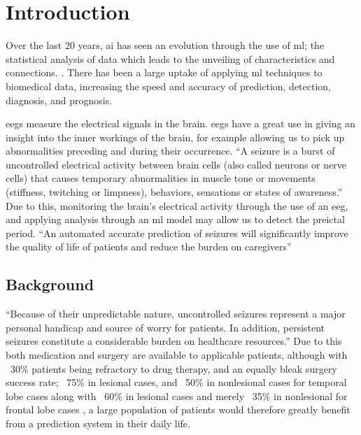 \documentclass[12pt]{article}
\begin{document}
\section{Introduction}


Over the last 20 years, \acrfull{ai} has seen an evolution through the use of \acrfull{ml}; the statistical analysis of data which leads to the unveiling of characteristics and connections. \cite{awad2015efficient}. There has been a large uptake of applying \acrshort{ml} techniques to biomedical data, increasing the speed and accuracy of prediction, detection, diagnosis, and prognosis. 

\acrfull{eegs} measure the electrical signals in the brain. \acrshort{eegs} have a great use in giving an insight into the inner workings of the brain, for example allowing us to pick up abnormalities preceding and during their occurrence. ``A seizure is a burst of uncontrolled electrical activity between brain cells (also called neurons or nerve cells) that causes temporary abnormalities in muscle tone or movements (stiffness, twitching or limpness), behaviors, sensations or states of awareness.'' \cite{johnHopkinsTypesOfSeizures} Due to this, monitoring the brain's electrical activity through the use of an \acrshort{eeg}, and applying analysis through an \acrshort{ml} model may allow us to detect the preictal period. ``An automated accurate prediction of seizures will significantly improve the quality of life of patients and reduce the burden on caregivers'' \cite{acharya2018automated}


\subsection{Background}

``Because of their unpredictable nature, uncontrolled seizures represent a major personal handicap and source of worry for patients. In addition, persistent seizures constitute a considerable burden on healthcare resources.'' \cite{assi2017towards} Due to this both medication and surgery are available to applicable patients, although with ~30\% patients being refractory to drug therapy, and an equally bleak surgery success rate; ~75\% in lesional cases, and ~50\% in nonlesional cases for temporal lobe cases along with ~60\% in lesional cases and merely ~35\% in nonlesional for frontal lobe cases \cite{assi2017towards}, a large population of patients would therefore greatly benefit from a prediction system in their daily life. 
\end{document}
